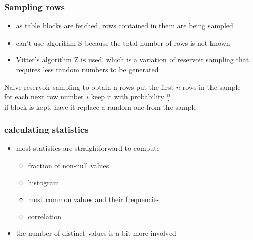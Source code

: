 \documentclass{beamer}
\begin{document}
\begin{frame}
  \frametitle{Sampling rows}

  \begin{itemize}
  \item as table \alert{blocks} are fetched, \alert{rows} contained in them are
    being sampled
  \item can't use algorithm S because the \alert{total number} of rows is not
    known
  \item \alert{Vitter's algorithm Z} is used, which is a variation of reservoir
    sampling that requires less random numbers to be generated
  \end{itemize}

  \begin{block}{Naive reservoir sampling to obtain n rows}
      \hspace*{2em}put the first $n$ rows in the sample\\
      \hspace*{2em}for each next row number $i$ keep it with probability $\frac{n}{i}$\\
      \hspace*{2em}if block is kept, have it replace a random one from the sample
  \end{block}
\end{frame}

\begin{frame}
  \frametitle{calculating statistics}

  \begin{itemize}
  \item most statistics are \alert{straightforward} to compute
    \begin{itemize}
    \item fraction of non-null values
    \item histogram
    \item most common values and their frequencies
    \item correlation
    \end{itemize}
  \item the number of \alert{distinct values} is a bit more involved
  \end{itemize}
\end{frame}
\end{document}
